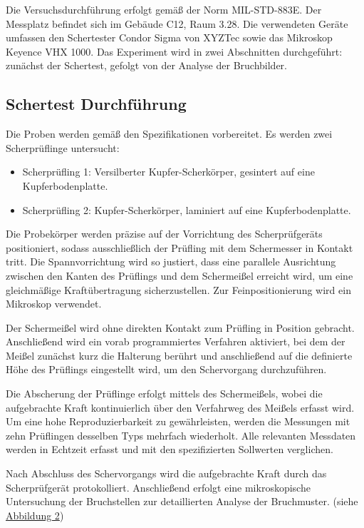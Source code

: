 Die Versuchsdurchführung erfolgt gemäß der Norm MIL-STD-883E. Der Messplatz befindet sich im Gebäude C12, Raum 3.28. Die verwendeten Geräte umfassen den Schertester Condor Sigma von XYZTec sowie das Mikroskop Keyence VHX 1000. Das Experiment wird in zwei Abschnitten durchgeführt: zunächst der Schertest, gefolgt von der Analyse der Bruchbilder.

\subsection{Schertest Durchführung}
Die Proben werden gemäß den Spezifikationen vorbereitet. Es werden zwei Scherprüflinge untersucht:
\begin{itemize}
    \item Scherprüfling 1: Versilberter Kupfer-Scherkörper, gesintert auf eine Kupferbodenplatte.
    \item     Scherprüfling 2: Kupfer-Scherkörper, laminiert auf eine Kupferbodenplatte.
\end{itemize}
Die Probekörper werden präzise auf der Vorrichtung des Scherprüfgeräts positioniert, sodass ausschließlich der Prüfling mit dem Schermesser in Kontakt tritt. Die Spannvorrichtung wird so justiert, dass eine parallele Ausrichtung zwischen den Kanten des Prüflings und dem Schermeißel erreicht wird, um eine gleichmäßige Kraftübertragung sicherzustellen. Zur Feinpositionierung wird ein Mikroskop verwendet.

Der Schermeißel wird ohne direkten Kontakt zum Prüfling in Position gebracht. Anschließend wird ein vorab programmiertes Verfahren aktiviert, bei dem der Meißel zunächst kurz die Halterung berührt und anschließend auf die definierte Höhe des Prüflings eingestellt wird, um den Schervorgang durchzuführen.

Die Abscherung der Prüflinge erfolgt mittels des Schermeißels, wobei die aufgebrachte Kraft kontinuierlich über den Verfahrweg des Meißels erfasst wird. Um eine hohe Reproduzierbarkeit zu gewährleisten, werden die Messungen mit zehn Prüflingen desselben Typs mehrfach wiederholt. Alle relevanten Messdaten werden in Echtzeit erfasst und mit den spezifizierten Sollwerten verglichen.

Nach Abschluss des Schervorgangs wird die aufgebrachte Kraft durch das Scherprüfgerät protokolliert. Anschließend erfolgt eine mikroskopische Untersuchung der Bruchstellen zur detaillierten Analyse der Bruchmuster. (siehe \hyperref[CondorSigma]{Abbildung 2})

